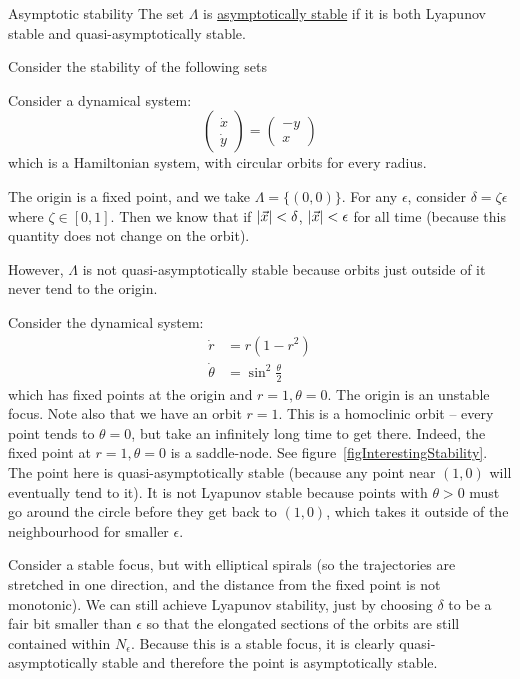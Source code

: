 \documentclass[../Main.tex]{subfiles}
\begin{document}
\begin{definition}{Asymptotic stability}
    The set $\Lambda$ is \underline{asymptotically stable} if it is both Lyapunov stable and quasi-asymptotically stable.
\end{definition}
\begin{examples}{
        Consider the stability of the following sets
    }
    \item Consider a dynamical system:
        \begin{equation*}
            \begin{pmatrix}\dot{x} \\ \dot{y}\end{pmatrix} = \begin{pmatrix}-y \\ x\end{pmatrix}
        \end{equation*}
        which is a Hamiltonian system, with circular orbits for every radius.

        The origin is a fixed point, and we take $\Lambda = \{(0, 0)\}$. For any $\epsilon$, consider $\delta = \zeta \epsilon$ where $\zeta \in [0, 1]$. Then we know that if $\left|\vec{x}\right| < \delta$, $\left|\vec{x}\right| < \epsilon$ for all time (because this quantity does not change on the orbit).

        However, $\Lambda$ is not quasi-asymptotically stable because orbits just outside of it never tend to the origin.
    \item Consider the dynamical system:
        \begin{align*}
            \dot{r} &= r(1-r^2) \\
            \dot{\theta} &= \sin^2 \frac\theta2
        \end{align*}
        which has fixed points at the origin and $r = 1, \theta = 0$. The origin is an unstable focus. Note also that we have an orbit $r = 1$. This is a homoclinic orbit -- every point tends to $\theta = 0$, but take an infinitely long time to get there. Indeed, the fixed point at $r = 1, \theta = 0$ is a saddle-node. See figure~\ref{figInterestingStability}. The point here is quasi-asymptotically stable (because any point near $(1, 0)$ will eventually tend to it). It is not Lyapunov stable because points with $\theta > 0$ must go around the circle before they get back to $(1, 0)$, which takes it outside of the neighbourhood for smaller $\epsilon$.
    \item Consider a stable focus, but with elliptical spirals (so the trajectories are stretched in one direction, and the distance from the fixed point is not monotonic). We can still achieve Lyapunov stability, just by choosing $\delta$ to be a fair bit smaller than $\epsilon$ so that the elongated sections of the orbits are still contained within $N_\epsilon$. Because this is a stable focus, it is clearly quasi-asymptotically stable and therefore the point is asymptotically stable.
\end{examples}
\end{document}
